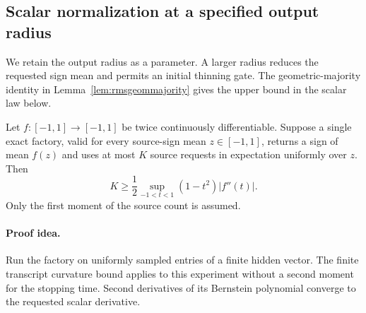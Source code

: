 \subsection{Scalar normalization at a specified output radius}
\label{sec:scalar-rms-amplitude}

We retain the output radius as a parameter. A larger radius reduces
the requested sign mean and permits an initial thinning gate.
The geometric-majority identity in Lemma~\ref{lem:rmsgeommajority}
gives the upper bound in the scalar law below.

\begin{lemma}
\label{lem:new-curvature-transfer}
Let $f\colon[-1,1]\to[-1,1]$ be twice continuously differentiable.
Suppose a single exact factory, valid for every source-sign mean
$z\in[-1,1]$, returns a sign of mean $f(z)$ and uses at most $K$
source requests in expectation uniformly over $z$.  Then
\[
 K\ge\frac12\sup_{-1<t<1}(1-t^2)|f''(t)|.
\]
Only the first moment of the source count is assumed.
\end{lemma}
\paragraph{Proof idea.}
Run the factory on uniformly sampled entries of a finite hidden
vector. The finite transcript curvature bound applies to this experiment
without a second moment for the stopping time. Second derivatives of its
Bernstein polynomial converge to the requested scalar derivative.

